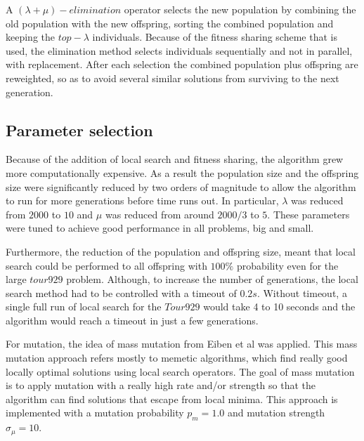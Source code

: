 \documentclass[a4paper,10pt]{article}
\newcommand{\ReplaceMe}[1]{{\color{blue}#1}}
\begin{document}
A $(\lambda+\mu)-elimination$ operator selects the new population by combining the old population with the new offspring, sorting the combined population and keeping the $top-\lambda$ individuals. Because of the fitness sharing scheme that is used, the elimination method selects individuals sequentially and not in parallel, with replacement. After each selection the combined population plus offspring are reweighted, so as to avoid several similar solutions from surviving to the next generation.

\subsection{Parameter selection}\label{ss:parameter_selection}


Because of the addition of local search and fitness sharing, the algorithm grew more computationally expensive. As a result the population size and the offspring size were significantly reduced by two orders of magnitude to allow the algorithm to run for more generations before time runs out. In particular, $\lambda$ was reduced from $2000$ to $10$ and $\mu$ was reduced from around $2000/3$ to $5$. These parameters were tuned to achieve good performance in all problems, big and small.

Furthermore, the reduction of the population and offspring size, meant that local search could be performed to all offspring with $100\%$ probability even for the large $tour929$ problem. Although, to increase the number of generations, the local search method had to be controlled with a timeout of $0.2s$. Without timeout, a single full run of local search for the $Tour929$ would take 4 to 10 seconds and the algorithm would reach a timeout in just a few generations.

For mutation, the idea of mass mutation from Eiben et al \cite{eiben} was applied. This mass mutation approach refers mostly to memetic algorithms, which find really good locally optimal solutions using local search operators. The goal of mass mutation is to apply mutation with a really high rate and/or strength so that the algorithm can find solutions that escape from local minima. This approach is implemented with a mutation probability $p_m = 1.0$ and mutation strength $\sigma_\mu = 10$.
\end{document}
